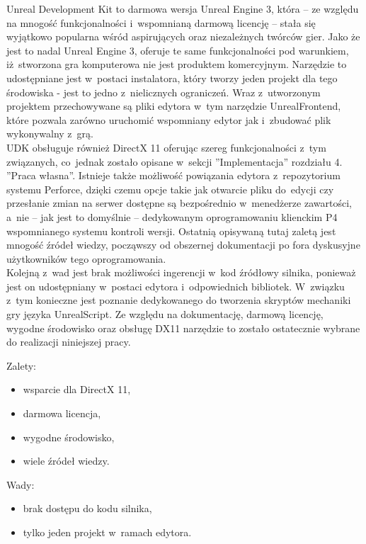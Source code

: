 Unreal Development Kit to darmowa wersja Unreal Engine 3, która -- ze względu na mnogość funkcjonalności i~wspomnianą darmową licencję -- stała się wyjątkowo popularna wśród aspirujących oraz niezależnych twórców gier. Jako że jest to nadal Unreal Engine 3, oferuje te same funkcjonalności pod warunkiem, iż~stworzona gra komputerowa nie jest produktem komercyjnym. Narzędzie to udostępniane jest w~postaci instalatora, który tworzy jeden projekt dla tego środowiska - jest to jedno z~nielicznych ograniczeń. Wraz z~utworzonym projektem przechowywane są pliki edytora w~tym narzędzie UnrealFrontend, które pozwala zarówno uruchomić wspomniany edytor jak i~zbudować plik wykonywalny z~grą.\\
UDK obsługuje również DirectX 11 oferując szereg funkcjonalności z~tym związanych, co~jednak zostało opisane w~sekcji ''Implementacja'' rozdziału 4. ''Praca własna''. Istnieje także możliwość powiązania edytora z~repozytorium systemu Perforce, dzięki czemu opcje takie jak otwarcie pliku do~edycji czy przesłanie zmian na serwer dostępne są bezpośrednio w~menedżerze zawartości, a~nie -- jak jest to domyślnie -- dedykowanym oprogramowaniu klienckim P4 wspomnianego systemu kontroli wersji. Ostatnią opisywaną tutaj zaletą jest mnogość źródeł wiedzy, począwszy od obszernej dokumentacji po fora dyskusyjne użytkowników tego oprogramowania.\\
Kolejną z~wad jest brak możliwości ingerencji w~kod źródłowy silnika, ponieważ jest on udostępniany w~postaci edytora i~odpowiednich bibliotek. W~związku z~tym konieczne jest poznanie dedykowanego do tworzenia skryptów mechaniki gry języka UnrealScript.
Ze względu na dokumentację, darmową licencję, wygodne środowisko oraz obsługę DX11 narzędzie to zostało ostatecznie wybrane do realizacji niniejszej pracy.\\

{\raggedright Zalety:
\begin{itemize}
\item wsparcie dla DirectX 11,
\item darmowa licencja,
\item wygodne środowisko,
\item wiele źródeł wiedzy.
\end{itemize}

Wady:
\begin{itemize}
\item brak dostępu do kodu silnika,
\item tylko jeden projekt w~ramach edytora.
\end{itemize}
}

